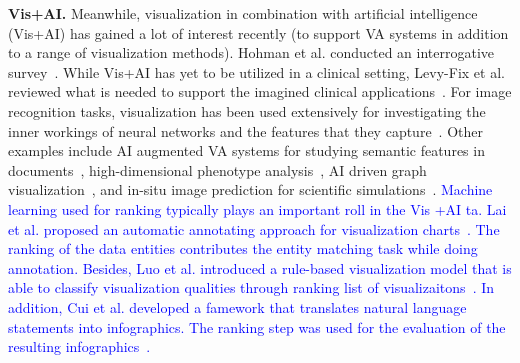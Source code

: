 

\vspace{1pt}
\noindent\textbf{Vis+AI.} Meanwhile, visualization in combination with artificial intelligence (Vis+AI) has gained a lot of interest recently (to support VA systems in addition to a range of visualization methods). Hohman et al. conducted an interrogative survey~\cite{8371286}.
While Vis+AI has yet to be utilized in a clinical setting, Levy-Fix et al. reviewed what is needed to support the imagined clinical applications~\cite{levy2019machine}. For image recognition tasks, visualization has been used extensively for investigating the inner workings of neural networks and the features that they capture~\cite{olah2017feature, 8022871, 8017583, 8827593}. Other examples include AI augmented VA systems for studying semantic features in documents~\cite{ji2019visual},  high-dimensional phenotype analysis~\cite{8827951}, AI driven graph visualization~\cite{8017580,8805452}, and in-situ image prediction for scientific simulations~\cite{he2019insitunet}. \textcolor{blue}{Machine learning used for ranking typically plays an important roll in the Vis +AI ta. Lai et al. proposed an automatic annotating approach for visualization charts~\cite{lai2020automatic}. The ranking of the data entities contributes the entity matching task while doing annotation. Besides, Luo et al. introduced a rule-based visualization model that is able to classify visualization qualities through ranking list of visualizaitons~\cite{8509240}. In addition, Cui et al. developed a famework that translates natural language statements into infographics. The ranking step was used for the evaluation of the resulting infographics~\cite{8813126}.}





